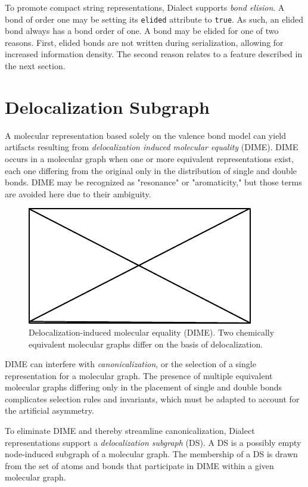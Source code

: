 \documentclass{article}
\def\ttt{\texttt}
\begin{document}
To promote compact string representations, Dialect supports \textit{bond elision}. A bond of order one may be setting its \ttt{elided} attribute to \ttt{true}. As such, an elided bond always has a bond order of one. A bond may be elided for one of two reasons. First, elided bonds are not written during serialization, allowing for increased information density. The second reason relates to a feature described in the next section.

\section*{Delocalization Subgraph}

A molecular representation based solely on the valence bond model can yield artifacts resulting from \textit{delocalization induced molecular equality} (DIME). DIME occurs in a molecular graph when one or more equivalent representations exist, each one differing from the original only in the distribution of single and double bonds. DIME may be recognized as "resonance" or "aromaticity," but those terms are avoided here due to their ambiguity.\cite{randic:2018,kerber:2006}

\begin{figure}
    \centering
    \includegraphics{filler}
    \caption{Delocalization-induced molecular equality (DIME). Two chemically equivalent molecular graphs differ on the basis of delocalization.}
    \label{fig:dime}
\end{figure}

DIME can interfere with \textit{canonicalization}, or the selection of a single representation for a molecular graph. The presence of multiple equivalent molecular graphs differing only in the placement of single and double bonds complicates selection rules and invariants, which must be adapted to account for the artificial asymmetry.

To eliminate DIME and thereby streamline canonicalization, Dialect representations support a \textit{delocalization subgraph} (DS). A DS is a possibly empty node-induced subgraph of a molecular graph. The membership of a DS is drawn from the set of atoms and bonds that participate in DIME within a given molecular graph.
\end{document}

